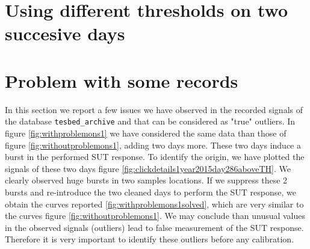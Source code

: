  \newpage\clearpage
\section{Using different thresholds on two succesive days}



\newpage\clearpage
\section{Problem with some records}
\label{ss:problems}
In this section we report a few issues we have observed in the recorded signals of the database {\tt tesbed\_archive} and that can be considered as "true" outliers.
In figure \ref{fig:withproblemons1} we have considered the same data than those of figure \ref{fig:withoutproblemons1}, adding two days more. These two days induce a burst in the performed SUT response. To identify the origin, we have plotted the signals of these two days figure \ref{fig:clickdetails1year2015day286aboveTH}. We clearly observed huge bursts in two samples locations. If we suppress these 2 bursts and re-introduce the two cleaned days to perform the SUT response, we obtain the curves reported \ref{fig:withproblemons1solved}, which are very similar to the curves figure \ref{fig:withoutproblemons1}. We may conclude than unusual values in the observed signals (outliers) lead to false measurement of the SUT response. Therefore it is very important to identify these outliers before any calibration.




